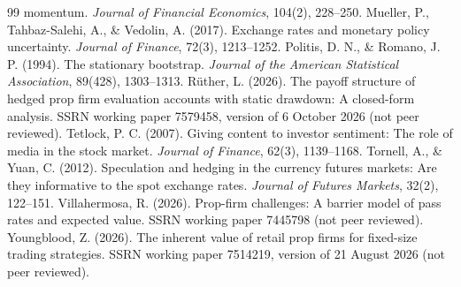\documentclass[11pt]{article}
\begin{document}
\begin{thebibliography}{99}
momentum. \emph{Journal of Financial Economics}, 104(2), 228--250.
 Mueller, P., Tahbaz-Salehi, A., \& Vedolin, A. (2017). Exchange rates
and monetary policy uncertainty. \emph{Journal of Finance}, 72(3), 1213--1252.
 Politis, D. N., \& Romano, J. P. (1994). The stationary bootstrap.
\emph{Journal of the American Statistical Association}, 89(428), 1303--1313.
 R\"uther, L. (2026). The payoff structure of hedged prop firm evaluation
accounts with static drawdown: A closed-form analysis. SSRN working paper 7579458, version of 6 October 2026 (not
peer reviewed).
 Tetlock, P. C. (2007). Giving content to investor sentiment: The role of media
in the stock market. \emph{Journal of Finance}, 62(3), 1139--1168.
 Tornell, A., \& Yuan, C. (2012). Speculation and hedging in the
currency futures markets: Are they informative to the spot exchange rates. \emph{Journal of Futures Markets},
32(2), 122--151.
 Villahermosa, R. (2026). Prop-firm challenges: A barrier model of
pass rates and expected value. SSRN working paper 7445798 (not peer reviewed).
 Youngblood, Z. (2026). The inherent value of retail prop firms for
fixed-size trading strategies. SSRN working paper 7514219, version of 21 August 2026 (not peer reviewed).
\end{thebibliography}
\end{document}
